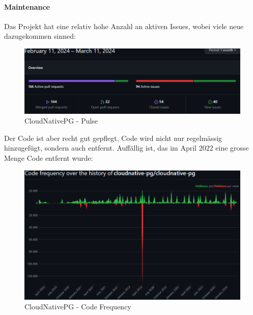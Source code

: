 \begin{flushleft}
    \paragraph{Maintenance}
    Das Projekt hat eine relativ hohe Anzahl an aktiven Issues, wobei viele neue dazugekommen sinned:
    \begin{figure}[H]
        \centering
        \includegraphics[width=0.75\linewidth]{source/implementation/evaluation/postgresql_ha_solutions/insights/cloudnativepg/pulse_cloudnative-pg_cloudnative-pg}
        \caption{CloudNativePG - Pulse}
        \label{fig:pulse_cloudnative-pg_cloudnative-pg}
    \end{figure}

    Der Code ist aber recht gut gepflegt, Code wird nicht nur regelmässig hinzugefügt, sondern auch entfernt.
    Auffällig ist, das im April 2022 eine grosse Menge Code entfernt wurde:
    \begin{figure}[H]
        \centering
        \includegraphics[width=0.75\linewidth]{source/implementation/evaluation/postgresql_ha_solutions/insights/cloudnativepg/code_frequency_cloudnative-pg_cloudnative-pg}
        \caption{CloudNativePG - Code Frequency}
        \label{fig:code_frequency_cloudnative-pg_cloudnative-pg}
    \end{figure}


\end{flushleft}

